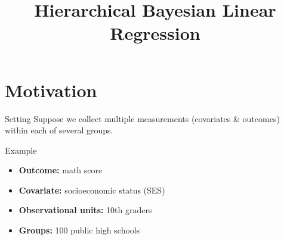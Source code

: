 \documentclass[10pt]{beamer}
\title{Hierarchical Bayesian Linear Regression}
\begin{document}
\maketitle

\section{Motivation}
\begin{frame}{Setting}
Suppose we collect multiple measurements (covariates \& outcomes) within each of several groups.
\vfill 

\begin{block}{Example}
\begin{itemize}
\item \textbf{Outcome:} math score	
\item \textbf{Covariate:} socioeconomic status (SES)	
\item \textbf{Observational units:} 10th graders
\item \textbf{Groups:} 100 public high schools 
\end{itemize}


\end{block}
\end{frame}
\end{document}
